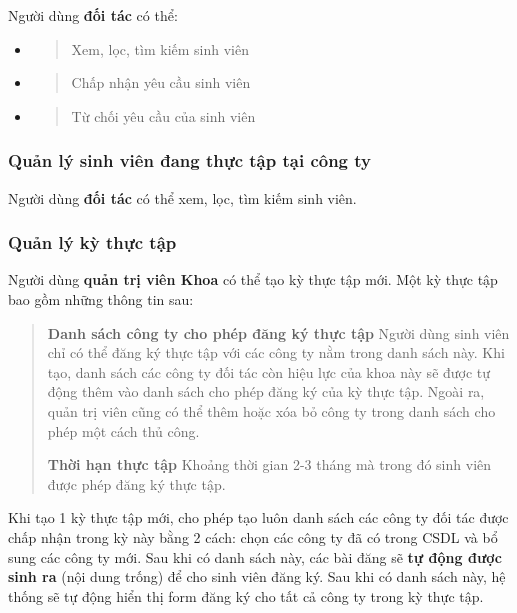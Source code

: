 \documentclass[./../main.tex]{subfiles}
\begin{document}
  Người dùng \textbf{đối tác} có thể:
  
  \begin{itemize}
  \item
    \begin{quote}
    Xem, lọc, tìm kiếm sinh viên
    \end{quote}
  \item
    \begin{quote}
    Chấp nhận yêu cầu sinh viên
    \end{quote}
  \item
    \begin{quote}
    Từ chối yêu cầu của sinh viên
    \end{quote}
  \end{itemize}
  
  \hypertarget{quux1ea3n-luxfd-sinh-viuxean-ux111ang-thux1ef1c-tux1eadp-tux1ea1i-cuxf4ng-ty}{%
  \subsubsection{Quản lý sinh viên đang thực tập tại công
  ty}\label{quux1ea3n-luxfd-sinh-viuxean-ux111ang-thux1ef1c-tux1eadp-tux1ea1i-cuxf4ng-ty}}
  
  Người dùng \textbf{đối tác} có thể xem, lọc, tìm kiếm sinh viên.
  
  \hypertarget{quux1ea3n-luxfd-kux1ef3-thux1ef1c-tux1eadp}{%
  \subsubsection{Quản lý kỳ thực
  tập}\label{quux1ea3n-luxfd-kux1ef3-thux1ef1c-tux1eadp}}
  
  Người dùng \textbf{quản trị viên Khoa} có thể tạo kỳ thực tập mới. Một
  kỳ thực tập bao gồm những thông tin sau:
  
  \begin{quote}
  \textbf{Danh sách công ty cho phép đăng ký thực tập} Người dùng sinh
  viên chỉ có thể đăng ký thực tập với các công ty nằm trong danh sách
  này. Khi tạo, danh sách các công ty đối tác còn hiệu lực của khoa này sẽ
  được tự động thêm vào danh sách cho phép đăng ký của kỳ thực tập. Ngoài
  ra, quản trị viên cũng có thể thêm hoặc xóa bỏ công ty trong danh sách
  cho phép một cách thủ công.
  
  \textbf{Thời hạn thực tập} Khoảng thời gian 2-3 tháng mà trong đó sinh
  viên được phép đăng ký thực tập.
  \end{quote}
  
  Khi tạo 1 kỳ thực tập mới, cho phép tạo luôn danh sách các công ty đối
  tác được chấp nhận trong kỳ này bằng 2 cách: chọn các công ty đã có
  trong CSDL và bổ sung các công ty mới. Sau khi có danh sách này, các bài
  đăng sẽ \textbf{tự động được sinh ra} (nội dung trống) để cho sinh viên
  đăng ký. Sau khi có danh sách này, hệ thống sẽ tự động hiển thị form
  đăng ký cho tất cả công ty trong kỳ thực tập.
  
\end{document}
